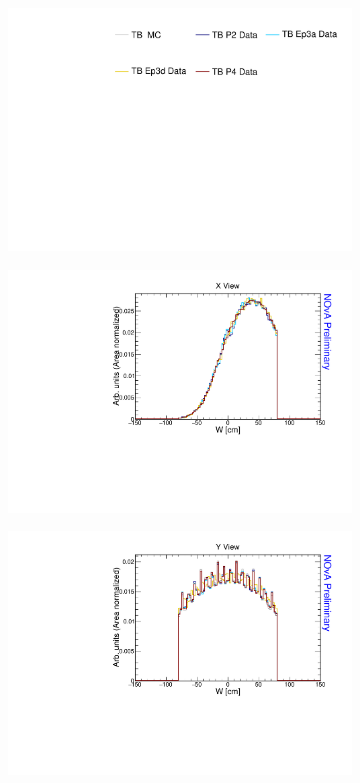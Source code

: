 \begin{figure}[ht!]
  \begin{subfigure}{\textwidth}
	\centering
   	\includegraphics[height=0.2\linewidth]{essentialsec_tb/legend.pdf}
  \end{subfigure}
  \vspace*{2mm}
  
  \begin{subfigure}{0.5\textwidth}
    \includegraphics[width=\linewidth]{essentialsec_tb/nhits_w_x.pdf}
  \end{subfigure}
  \begin{subfigure}{0.5\textwidth}
    \includegraphics[width=\linewidth]{essentialsec_tb/nhits_w_y.pdf}

\end{subfigure}
\end{figure}
